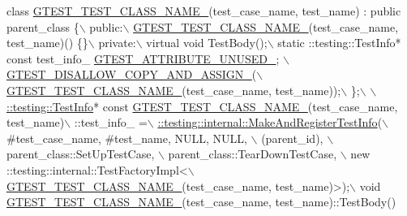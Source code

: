 \begin{DoxyCode}
\textcolor{keyword}{class }\hyperlink{fused-src_2gtest_2gtest_8h_a87a1ee3a3b9b798195236d053f2e5dcc}{GTEST\_TEST\_CLASS\_NAME\_}(test\_case\_name, test\_name) : \textcolor{keyword}{public} parent\_class \{\(\backslash\)
 public:\hyperlink{fused-src_2gtest_2gtest_8h_a87a1ee3a3b9b798195236d053f2e5dcc}{\(\backslash\)}
\hyperlink{fused-src_2gtest_2gtest_8h_a87a1ee3a3b9b798195236d053f2e5dcc}{  GTEST\_TEST\_CLASS\_NAME\_}(test\_case\_name, test\_name)() \{\}\(\backslash\)
 private:\(\backslash\)
  virtual \textcolor{keywordtype}{void} TestBody();\(\backslash\)
  static ::testing::TestInfo* \textcolor{keyword}{const} test\_info\_ \hyperlink{fused-src_2gtest_2gtest_8h_a01f3b31960fc7c4c7ee4b398a914f89a}{GTEST\_ATTRIBUTE\_UNUSED\_};
      \hyperlink{fused-src_2gtest_2gtest_8h_aed8c1888c32b588b0681e88b95031e29}{\(\backslash\)}
\hyperlink{fused-src_2gtest_2gtest_8h_aed8c1888c32b588b0681e88b95031e29}{  GTEST\_DISALLOW\_COPY\_AND\_ASSIGN\_}(\(\backslash\)
      \hyperlink{fused-src_2gtest_2gtest_8h_a87a1ee3a3b9b798195236d053f2e5dcc}{GTEST\_TEST\_CLASS\_NAME\_}(test\_case\_name, test\_name));\(\backslash\)
\};\(\backslash\)
\(\backslash\)
\hyperlink{classtesting_1_1_test_info}{::testing::TestInfo}* \textcolor{keyword}{const} \hyperlink{fused-src_2gtest_2gtest_8h_a87a1ee3a3b9b798195236d053f2e5dcc}{GTEST\_TEST\_CLASS\_NAME\_}(test\_case\_name, 
      test\_name)\(\backslash\)
  ::test\_info\_ =\hyperlink{namespacetesting_1_1internal_a8280dfb4f7c8d5b71184f91f4725f759}{\(\backslash\)}
\hyperlink{namespacetesting_1_1internal_a8280dfb4f7c8d5b71184f91f4725f759}{    ::testing::internal::MakeAndRegisterTestInfo}(\(\backslash\)
        #test\_case\_name, #test\_name, NULL, NULL, \(\backslash\)
        (parent\_id), \(\backslash\)
        parent\_class::SetUpTestCase, \(\backslash\)
        parent\_class::TearDownTestCase, \(\backslash\)
        new ::testing::internal::TestFactoryImpl<\(\backslash\)
            \hyperlink{fused-src_2gtest_2gtest_8h_a87a1ee3a3b9b798195236d053f2e5dcc}{GTEST\_TEST\_CLASS\_NAME\_}(test\_case\_name, test\_name)>);\(\backslash\)
void \hyperlink{fused-src_2gtest_2gtest_8h_a87a1ee3a3b9b798195236d053f2e5dcc}{GTEST\_TEST\_CLASS\_NAME\_}(test\_case\_name, test\_name)::TestBody()
\end{DoxyCode}
